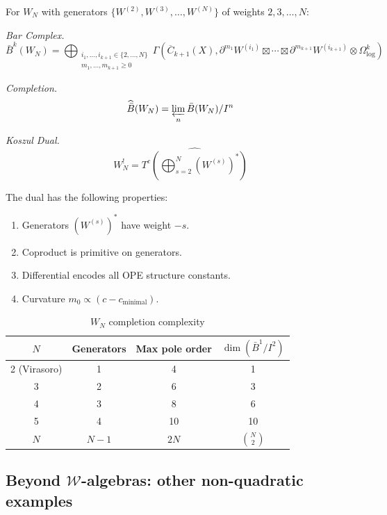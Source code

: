 \begin{construction}
\label{const:wn-general}

For $W_N$ with generators $\{W^{(2)}, W^{(3)}, \ldots, W^{(N)}\}$ of weights $2, 3, \ldots, N$:

\medskip
\noindent\emph{Bar Complex.}
\[\bar{B}^k(W_N) = \bigoplus_{\substack{i_1,\ldots,i_{k+1} \in \{2,\ldots,N\} \\ m_1,\ldots,m_{k+1} \geq 0}} \Gamma\left(\overline{C}_{k+1}(X), \partial^{m_1} W^{(i_1)} \boxtimes \cdots \boxtimes \partial^{m_{k+1}} W^{(i_{k+1})} \otimes \Omega^k_{\log}\right)\]

\medskip
\noindent\emph{Completion.}
\[\widehat{\bar{B}}(W_N) = \varprojlim_n \bar{B}(W_N)/I^n\]

\medskip
\noindent\emph{Koszul Dual.}
\[W_N^! = \widehat{T^c\left(\bigoplus_{s=2}^N (W^{(s)})^*\right)}\]

The dual has the following properties:
\begin{enumerate}
\item Generators $(W^{(s)})^*$ have weight $-s$.
\item Coproduct is primitive on generators.
\item Differential encodes all OPE structure constants.
\item Curvature $m_0 \propto (c - c_{\text{minimal}})$.
\end{enumerate}
\end{construction}

\begin{table}[ht]
\centering
\caption{$W_N$ completion complexity}
\begin{tabular}{|c|c|c|c|}
\hline
$N$ & Generators & Max pole order & $\dim(\bar{B}^1/I^2)$ \\
\hline
2 (Virasoro) & 1 & 4 & 1 \\
3 & 2 & 6 & 3 \\
4 & 3 & 8 & 6 \\
5 & 4 & 10 & 10 \\
$N$ & $N-1$ & $2N$ & $\binom{N}{2}$ \\
\hline
\end{tabular}
\end{table}


\subsection{Beyond $\mathcal{W}$-algebras: other non-quadratic examples}

